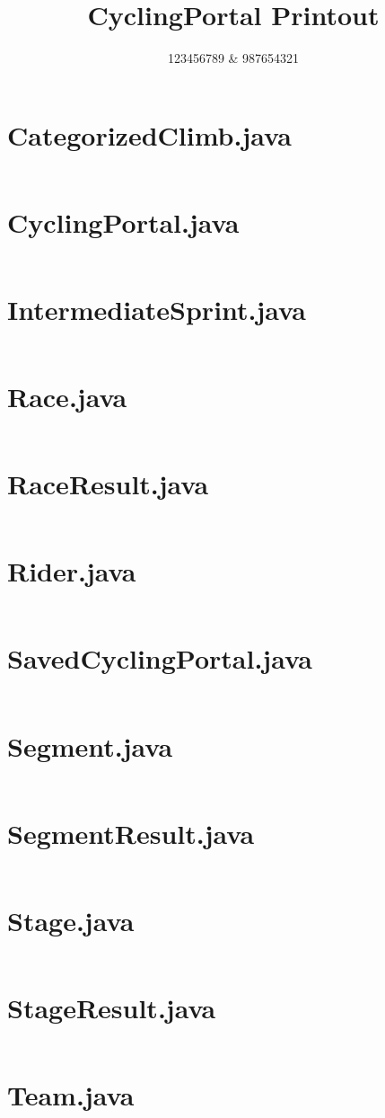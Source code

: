 \documentclass[a4paper, 12pt]{article}
\newcommand{\includesrc}[1]{
    \section{#1}
    \inputminted[linenos,fontsize=\footnotesize, breaklines, obeytabs=true,tabsize=2]{java}{./CyclingPortal/src/cycling/#1}
}
\begin{document}
    \title{\textrm{CyclingPortal Printout}}
    \author{\textrm{123456789 \& 987654321}}
    \date{}
    \maketitle
    \tableofcontents
    \newpage
    \includesrc{CategorizedClimb.java}
    \includesrc{CyclingPortal.java}
    \includesrc{IntermediateSprint.java}
    \includesrc{Race.java}
    \includesrc{RaceResult.java}
    \includesrc{Rider.java}
    \includesrc{SavedCyclingPortal.java}
    \includesrc{Segment.java}
    \includesrc{SegmentResult.java}
    \includesrc{Stage.java}
    \includesrc{StageResult.java}
    \includesrc{Team.java}
\end{document}
